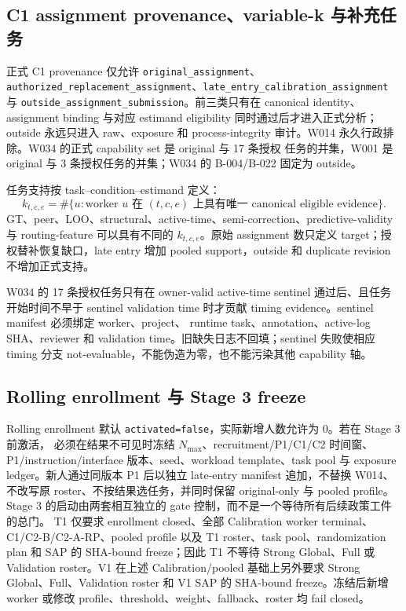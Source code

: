 \subsection{C1 assignment provenance、variable-k 与补充任务}

正式 C1 provenance 仅允许 \texttt{original\_assignment}、
\texttt{authorized\_replacement\_assignment}、\texttt{late\_entry\_calibration\_assignment}
与 \texttt{outside\_assignment\_submission}。前三类只有在 canonical identity、assignment binding
与对应 estimand eligibility 同时通过后才进入正式分析；outside 永远只进入 raw、exposure 和
process-integrity 审计。W014 永久行政排除。W034 的正式 capability set 是 original 与 17 条授权
任务的并集，W001 是 original 与 3 条授权任务的并集；W034 的 B-004/B-022 固定为 outside。

任务支持按 task--condition--estimand 定义：
\[
k_{t,c,e}=\#\{u:\text{worker }u\text{ 在 }(t,c,e)\text{ 上具有唯一 canonical eligible evidence}\}.
\]
GT、peer、LOO、structural、active-time、semi-correction、predictive-validity 与 routing-feature
可以具有不同的 \(k_{t,c,e}\)。原始 assignment 数只定义 target；授权替补恢复缺口，late entry
增加 pooled support，outside 和 duplicate revision 不增加正式支持。

W034 的 17 条授权任务只有在 owner-valid active-time sentinel 通过后、且任务开始时间不早于
sentinel validation time 时才贡献 timing evidence。sentinel manifest 必须绑定 worker、project、
runtime task、annotation、active-log SHA、reviewer 和 validation time。旧缺失日志不回填；sentinel
失败使相应 timing 分支 not-evaluable，不能伪造为零，也不能污染其他 capability 轴。

\subsection{Rolling enrollment 与 Stage 3 freeze}

Rolling enrollment 默认 \texttt{activated=false}，实际新增人数允许为 0。若在 Stage 3 前激活，
必须在结果不可见时冻结 \(N_{\max}\)、recruitment/P1/C1/C2 时间窗、P1/instruction/interface
版本、seed、workload template、task pool 与 exposure ledger。新人通过同版本 P1 后以独立 late-entry
manifest 追加，不替换 W014、不改写原 roster、不按结果选任务，并同时保留 original-only 与 pooled
profile。Stage 3 的启动由两套相互独立的 gate 控制，而不是一个等待所有后续政策工件的总门。
T1 仅要求 enrollment closed、全部 Calibration worker terminal、C1/C2-B/C2-A-RP、pooled profile
以及 T1 roster、task pool、randomization plan 和 SAP 的 SHA-bound freeze；因此 T1 不等待
Strong Global、Full 或 Validation roster。V1 在上述 Calibration/pooled 基础上另外要求
Strong Global、Full、Validation roster 和 V1 SAP 的 SHA-bound freeze。冻结后新增 worker 或修改
profile、threshold、weight、fallback、roster 均 fail closed。

